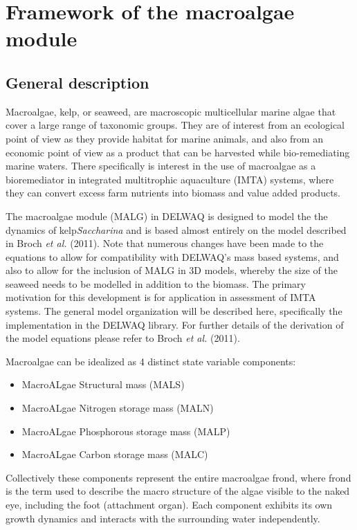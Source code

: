 \documentclass{deltares_manual}
\begin{document}
\section{Framework of the macroalgae module}

\subsection{General description}

Macroalgae, kelp, or seaweed, are macroscopic multicellular marine algae that cover a large range of taxonomic groups. They are of interest from an ecological point of view as they provide habitat for marine animals, and also from an economic point of view as a product that can be harvested while bio-remediating marine waters. There specifically is interest in the use of macroalgae as a bioremediator in integrated multitrophic aquaculture (IMTA) systems, where they can convert excess farm nutrients into biomass and value added products. 

The macroalgae module (MALG) in DELWAQ is designed to model the the dynamics of kelp\textit{Saccharina} and is based almost entirely on the model described in Broch \textit{et al.} (2011). Note that numerous changes have been made to the equations to allow for compatibility with DELWAQ's mass based systems, and also to allow for the inclusion of MALG in 3D models, whereby the size of the seaweed needs to be modelled in addition to the biomass. The primary motivation for this development is for application in assessment of IMTA systems. The general model organization will be described here, specifically the implementation in the DELWAQ library. For further details of the derivation of the model equations please refer to Broch \textit{et al.} (2011).

Macroalgae can be idealized as 4 distinct state variable components:
\begin{itemize}
\item MacroALgae Structural mass (MALS)
\item MacroALgae Nitrogen storage mass (MALN)
\item MacroALgae Phosphorous storage mass (MALP)
\item MacroALgae Carbon storage mass (MALC)
\end{itemize}
Collectively these components represent the entire macroalgae frond, where frond is the term used to describe the macro structure of the algae visible to the naked eye, including the foot (attachment organ). Each component exhibits its own growth dynamics and interacts with the surrounding water independently. 
\end{document}
